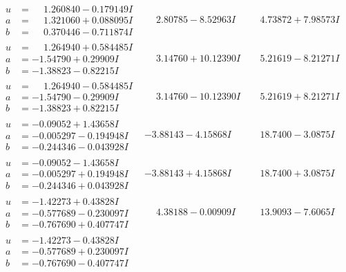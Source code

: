 \documentclass[1p]{elsarticle_modified}
\theoremstyle{definition}
\begin{document}
$$\begin{array}{c|c|c}
\begin{aligned}
u &= \phantom{-}1.260840 - 0.179149 I \\
a &= \phantom{-}1.321060 + 0.088095 I \\
b &= \phantom{-}0.370446 - 0.711874 I\end{aligned}
 & \phantom{-}2.80785 - 8.52963 I & \phantom{-}4.73872 + 7.98573 I \\ \hline\begin{aligned}
u &= \phantom{-}1.264940 + 0.584485 I \\
a &= -1.54790 + 0.29909 I \\
b &= -1.38823 - 0.82215 I\end{aligned}
 & \phantom{-}3.14760 + 10.12390 I & \phantom{-}5.21619 - 8.21271 I \\ \hline\begin{aligned}
u &= \phantom{-}1.264940 - 0.584485 I \\
a &= -1.54790 - 0.29909 I \\
b &= -1.38823 + 0.82215 I\end{aligned}
 & \phantom{-}3.14760 - 10.12390 I & \phantom{-}5.21619 + 8.21271 I \\ \hline\begin{aligned}
u &= -0.09052 + 1.43658 I \\
a &= -0.005297 - 0.194948 I \\
b &= -0.244346 - 0.043928 I\end{aligned}
 & -3.88143 - 4.15868 I & \phantom{-}18.7400 - 3.0875 I \\ \hline\begin{aligned}
u &= -0.09052 - 1.43658 I \\
a &= -0.005297 + 0.194948 I \\
b &= -0.244346 + 0.043928 I\end{aligned}
 & -3.88143 + 4.15868 I & \phantom{-}18.7400 + 3.0875 I \\ \hline\begin{aligned}
u &= -1.42273 + 0.43828 I \\
a &= -0.577689 - 0.230097 I \\
b &= -0.767690 + 0.407747 I\end{aligned}
 & \phantom{-}4.38188 - 0.00909 I & \phantom{-}13.9093 - 7.6065 I \\ \hline\begin{aligned}
u &= -1.42273 - 0.43828 I \\
a &= -0.577689 + 0.230097 I \\
b &= -0.767690 - 0.407747 I\end{aligned}

\end{array}$$
\end{document}
